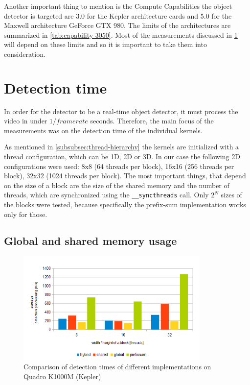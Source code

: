 Another important thing to mention is the Compute Capabilities the object detector is targeted are 3.0 for the Kepler architecture cards and 5.0 for the Maxwell architecture GeForce GTX 980. The limits of the architectures are summarized in \ref{tab:capability-3050}. Most of the measurements discussed in \ref{sec:detection-time} will depend on these limits and so it is important to take them into consideration.

\section{Detection time}\label{sec:detection-time}

In order for the detector to be a real-time object detector, it must process the video in under $1/framerate$ seconds. Therefore, the main focus of the measurements was on the detection time of the individual kernels.

As mentioned in \ref{subsubsec:thread-hierarchy} the kernels are initialized with a thread configuration, which can be 1D, 2D or 3D. In our case the following 2D configurations were used: 8x8 (64 threads per block), 16x16 (256 threads per block), 32x32 (1024 threads per block). The most important things, that depend on the size of a block are the size of the shared memory and the number of threads, which are synchronized using the \verb|__syncthreads| call. Only $2^N$ sizes of the blocks were tested, because specifically the prefix-sum implementation works only for those.

\subsection{Global and shared memory usage}

\begin{figure}
	\label{fig:quadro-det-measurement}
	\centering\includegraphics[width=0.85\textwidth]{fig/1080_detection_quadrok1000m.png}
	\caption{Comparison of detection times of different implementations on Quadro K1000M (Kepler)}
\end{figure}

